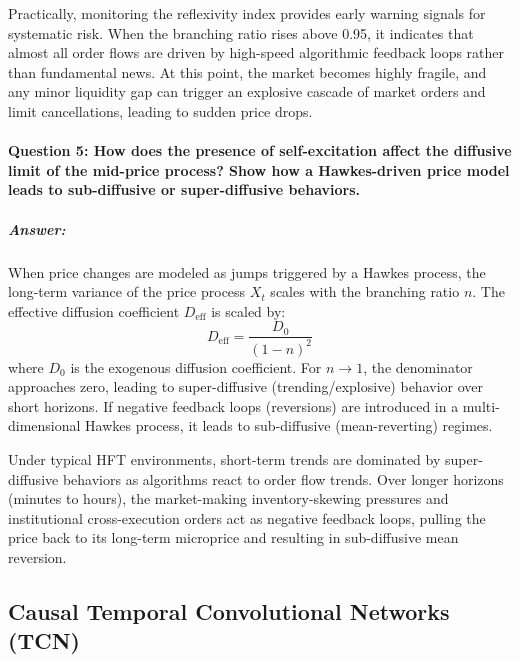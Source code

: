 \documentclass[11pt,a4paper]{article}
\begin{document}
Practically, monitoring the reflexivity index provides early warning signals for systematic risk. When the branching ratio rises above 0.95, it indicates that almost all order flows are driven by high-speed algorithmic feedback loops rather than fundamental news. At this point, the market becomes highly fragile, and any minor liquidity gap can trigger an explosive cascade of market orders and limit cancellations, leading to sudden price drops.

\paragraph{Question 5: How does the presence of self-excitation affect the diffusive limit of the mid-price process? Show how a Hawkes-driven price model leads to sub-diffusive or super-diffusive behaviors.}
\subparagraph{Answer:}
When price changes are modeled as jumps triggered by a Hawkes process, the long-term variance of the price process $X_t$ scales with the branching ratio $n$. The effective diffusion coefficient $D_{\text{eff}}$ is scaled by:
\begin{equation}
    D_{\text{eff}} = \frac{D_0}{(1 - n)^2}
\end{equation}
where $D_0$ is the exogenous diffusion coefficient. For $n \to 1$, the denominator approaches zero, leading to super-diffusive (trending/explosive) behavior over short horizons. If negative feedback loops (reversions) are introduced in a multi-dimensional Hawkes process, it leads to sub-diffusive (mean-reverting) regimes.

Under typical HFT environments, short-term trends are dominated by super-diffusive behaviors as algorithms react to order flow trends. Over longer horizons (minutes to hours), the market-making inventory-skewing pressures and institutional cross-execution orders act as negative feedback loops, pulling the price back to its long-term microprice and resulting in sub-diffusive mean reversion.

\subsection{Causal Temporal Convolutional Networks (TCN)}
\end{document}
